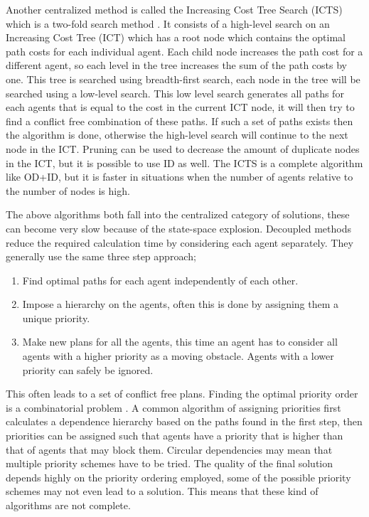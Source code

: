 Another centralized method is called the Increasing Cost Tree Search (ICTS)
which is a
two-fold search method \cite{sharon2013}. It consists of a high-level search on
an Increasing Cost Tree (ICT) which has a root node which contains the optimal
path costs for each individual agent. Each child node increases the path cost
for a different agent, so each level in the tree increases the sum of the path
costs by one. This tree is searched using breadth-first search, each node in
the tree will be searched using a low-level search. This low level search
generates all paths for each agents that is equal to the cost in the current
ICT node, it will then try to find a conflict free combination of these paths.
If such a set of paths exists then the algorithm is done, otherwise the
high-level search will continue to the next node in the ICT. Pruning can be
used to decrease the amount of duplicate nodes in the ICT, but it is possible
to use ID as well. The ICTS is a complete algorithm like OD+ID, but it is
faster in situations when the number of agents relative to the number of nodes
is high.


The above algorithms both fall into the centralized category of solutions, these
can become very slow because of the state-space explosion. Decoupled methods
reduce the required calculation time by considering each agent separately. They
generally use the same three step approach;
\begin{enumerate}
    \item Find optimal paths for each agent independently of each other.
    \item Impose a hierarchy on the agents, often this is done by assigning
    them a unique priority.
    \item Make new plans for all the agents, this time an agent has to consider
    all agents with a higher priority as a moving obstacle. Agents with a lower
    priority can safely be ignored.
\end{enumerate}
This often leads to a set of conflict free plans. Finding the optimal priority
order is a combinatorial problem \cite{bennewitz2002}. A common algorithm of
assigning priorities first calculates a dependence hierarchy based on the paths
found in the first step, then priorities can be assigned such that agents have
a priority that is higher than that of agents that may block them. Circular
dependencies may mean that multiple priority schemes have to be tried. The
quality of the final solution depends highly on the priority ordering employed,
some of the possible priority schemes may not even lead to a solution. This
means that these kind of algorithms are not complete.

